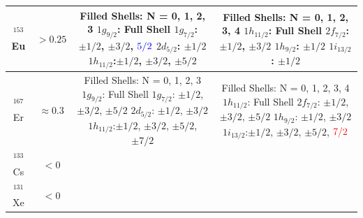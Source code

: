 \documentclass[10pt,a4paper, twoside]{report}
\begin{document}
\begin{table}[htbp]
\begin{tabular}{c|c|c|c}
\midrule
$^{153}$Eu & $> 0.25$
    &  \pbox{20cm}{Filled Shells: N = 0, 1, 2, 3 \\
    $1g_{9/2}$: Full Shell \\
    $1g_{7/2}$: $\pm 1/2$, $\pm 3/2$, $\textcolor{blue}{5/2}$ \\
    $2d_{5/2}$: $\pm 1/2$ \\ 
    $1h_{11/2}$:$\pm 1/2$, $\pm 3/2$, $\pm 5/2$}          
    &  \pbox{20cm}{Filled Shells: N = 0, 1, 2, 3, 4 \\
    $1h_{11/2}$: Full Shell \\
    $2f_{7/2}$:$\pm 1/2$, $\pm 3/2$ \\
    $1h_{9/2}$: $\pm 1/2$ \\
    $1i_{13/2}$: $\pm 1/2$} \\
\midrule
$^{167}$Er & $\approx 0.3$          
    &  \pbox{20cm}{Filled Shells: N = 0, 1, 2, 3 \\
    $1g_{9/2}$: Full Shell \\
    $1g_{7/2}$: $\pm 1/2$, $\pm 3/2$, $\pm 5/2$\\
    $2d_{5/2}$: $\pm 1/2$, $\pm 3/2$ \\
    $1h_{11/2}$:$\pm 1/2$, $\pm 3/2$, $\pm 5/2$, $\pm 7/2$ }              
    &  \pbox{20cm}{Filled Shells: N = 0, 1, 2, 3, 4 \\
    $1h_{11/2}$: Full Shell \\
    $2f_{7/2}$: $\pm 1/2$, $\pm 3/2$, $\pm 5/2$ \\
    $1h_{9/2}$: $\pm 1/2$, $\pm 3/2$ \\
    $1i_{13/2}$:$\pm 1/2$, $\pm 3/2$, $\pm 5/2$, $\textcolor{red}{7/2}$} \\
\midrule
$^{133}$Cs & $< 0$                  &         & \\
$^{131}$Xe & $< 0$                  &         & \\
\bottomrule
\bottomrule
\end{tabular}
\end{table}
\clearpage
\listoffigures
\clearpage
\listoftables



\end{document}
